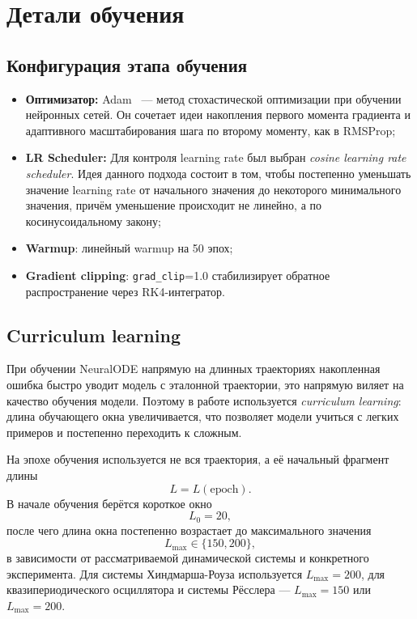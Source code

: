 \documentclass[PMI,VKR]{HSEUniversity}
\begin{document}
\section{Детали обучения}

\subsection{Конфигурация этапа обучения}

\begin{itemize}
    \item \textbf{Оптимизатор:} Adam~\cite{kingma2017adam} — 
    метод стохастической оптимизации при обучении
    нейронных сетей. Он сочетает идеи накопления первого момента
    градиента\cite{sutskever2013importance} и адаптивного масштабирования
    шага по второму моменту, как в RMSProp;

    \item \textbf{LR Scheduler:} Для контроля learning rate был выбран
    \textit{cosine learning rate scheduler}. Идея данного подхода
    состоит в том, чтобы постепенно уменьшать значение learning rate от
    начального значения до некоторого минимального значения, причём
    уменьшение происходит не линейно, а по косинусоидальному закону;

    \item \textbf{Warmup}: линейный warmup на 50 эпох;
    
    \item \textbf{Gradient clipping}: \texttt{grad\_clip}=1.0
    стабилизирует обратное распространение через RK4-интегратор.

\end{itemize} 

\subsection{Curriculum learning}
\label{sec:curriculum_learning}

При обучении NeuralODE напрямую на длинных траекториях накопленная ошибка быстро уводит
модель с эталонной траектории, это напрямую виляет на качество обучения модели. 
Поэтому в работе используется \emph{curriculum learning}: 
длина обучающего окна увеличивается, что позволяет модели учиться с легких примеров и постепенно переходить к сложным.

На эпохе обучения используется не вся траектория, а её начальный
фрагмент длины
\[
    L = L(\text{epoch}).
\]
В начале обучения берётся короткое окно
\[
    L_{0}=20,
\]
после чего длина окна постепенно возрастает до максимального значения
\[
    L_{\max}\in\{150,200\},
\]
в зависимости от рассматриваемой динамической системы и конкретного
эксперимента. Для системы Хиндмарша-Роуза используется
$L_{\max}=200$, для квазипериодического осциллятора и системы Рёсслера
— $L_{\max}=150$ или $L_{\max}=200$.
\end{document}
